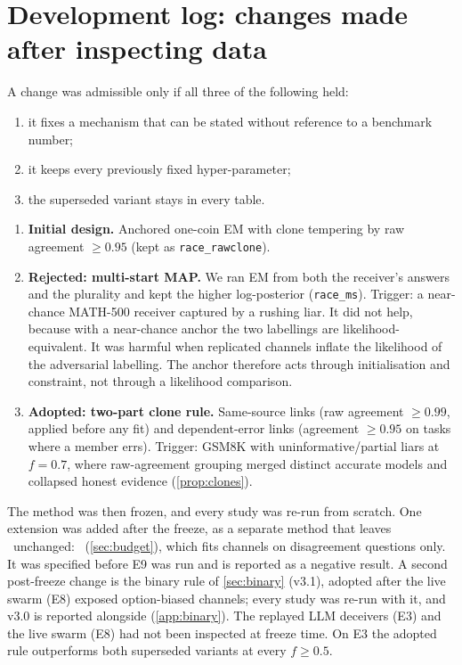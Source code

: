 \section{Development log: changes made after inspecting data}\label{app:devlog}

A change was admissible only if all three of the following held:
\begin{enumerate}
\item it fixes a mechanism that can be stated without reference to a benchmark number;
\item it keeps every previously fixed hyper-parameter;
\item the superseded variant stays in every table.
\end{enumerate}

\begin{enumerate}
\item \textbf{Initial design.} Anchored one-coin EM with clone tempering by raw agreement $\ge0.95$ (kept as \texttt{race\_rawclone}).
\item \textbf{Rejected: multi-start MAP.} We ran EM from both the receiver's answers and the plurality and kept the higher log-posterior (\texttt{race\_ms}). Trigger: a near-chance MATH-500 receiver captured by a rushing liar. It did not help, because with a near-chance anchor the two labellings are likelihood-equivalent. It was harmful when replicated channels inflate the likelihood of the adversarial labelling. The anchor therefore acts through initialisation and constraint, not through a likelihood comparison.
\item \textbf{Adopted: two-part clone rule.} Same-source links (raw agreement $\ge0.99$, applied before any fit) and dependent-error links (agreement $\ge0.95$ on tasks where a member errs). Trigger: GSM8K with uninformative/partial liars at $f=0.7$, where raw-agreement grouping merged distinct accurate models and collapsed honest evidence (\cref{prop:clones}).
\end{enumerate}
The method was then frozen, and every study was re-run from scratch. One extension was added after the freeze, as a separate method that leaves \race\ unchanged: \raceD\ (\cref{sec:budget}), which fits channels on disagreement questions only. It was specified before E9 was run and is reported as a negative result. A second post-freeze change is the binary rule of \cref{sec:binary} (v3.1), adopted after the live swarm (E8) exposed option-biased channels; every study was re-run with it, and v3.0 is reported alongside (\cref{app:binary}). The replayed LLM deceivers (E3) and the live swarm (E8) had not been inspected at freeze time. On E3 the adopted rule outperforms both superseded variants at every $f\ge0.5$.

